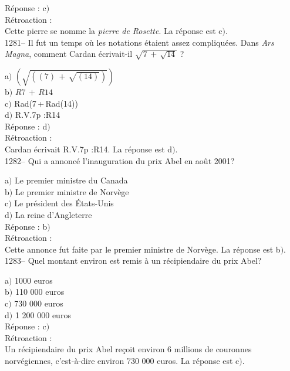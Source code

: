 ﻿\documentclass[letterpaper, 12pt]{article}
\begin{document}
R\'eponse : c$)$\\

R\'etroaction : \\
Cette pierre se nomme la {\sl pierre de Rosette}.
La r\'eponse est  c$)$.\\

1281-- Il fut un temps o\`u les notations \'etaient assez
compliqu\'ees. Dans {\sl Ars Magna}, comment Cardan \'ecrivait-il
$\sqrt{7\,+\,\sqrt{14}}$ ?

a$)$ $(\sqrt{((7)\,+\,\sqrt{(14)})})$ \\[2mm]
b$)$ $R7\,+\,R14$ \\[2mm]
c$)$ Rad(7\,+\,Rad(14)) \\[2mm]
d$)$ R.V.7p :R14\\

R\'eponse : d$)$\\

R\'etroaction : \\
Cardan \'ecrivait R.V.7p :R14.
La r\'eponse est  d$)$.\\

1282-- Qui a annonc\'e l'inauguration du prix Abel en ao\^ut 2001?

a$)$ Le premier ministre du Canada \\
b$)$ Le premier ministre de Norv\`ege \\
c$)$ Le pr\'esident des \'Etats-Unis \\
d$)$ La reine d'Angleterre\\

R\'eponse : b$)$\\

R\'etroaction : \\
Cette annonce fut faite par le premier ministre de Norv\`ege.
La r\'eponse est  b$)$.\\

1283-- Quel montant environ est remis \`a un r\'ecipiendaire du prix
Abel?

a$)$ 1000 euros \\
b$)$ 110 000 euros \\
c$)$ 730 000 euros \\
d$)$ 1 200 000 euros\\

R\'eponse : c$)$\\

R\'etroaction : \\
Un r\'ecipiendaire du prix Abel re\c coit environ 6 millions de
couronnes norv\'egiennes,  c'est-\`a-dire environ 730 000 euros.
La r\'eponse est  c$)$.\\
\end{document}
